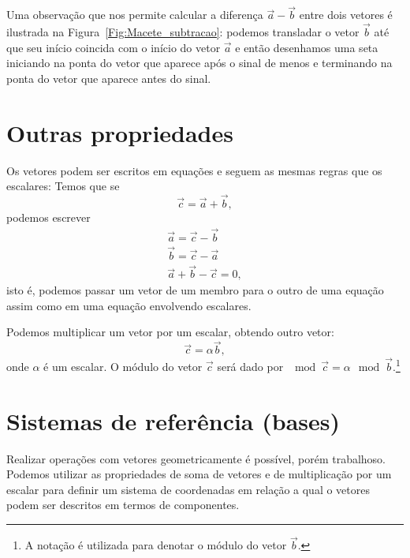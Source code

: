 Uma observação que nos permite calcular a diferença $\vec{a} - \vec{b}$ entre dois vetores é ilustrada na Figura~\ref{Fig:Macete_subtracao}: podemos transladar o vetor $\vec{b}$ até que seu início coincida com o início do vetor $\vec{a}$ e então desenhamos uma seta iniciando na ponta do vetor que aparece após o sinal de menos e terminando na ponta do vetor que aparece antes do sinal.

\section{Outras propriedades}

Os vetores podem ser escritos em equações e seguem as mesmas regras que os escalares: Temos que se
\begin{equation}
  \vec{c} = \vec{a} + \vec{b},
\end{equation}
%
podemos escrever
\begin{align}
  \vec{a} = \vec{c} - \vec{b} \\
  \vec{b} = \vec{c} - \vec{a} \\
  \vec{a} + \vec{b} - \vec{c} = 0,
\end{align}
%
isto é, podemos passar um vetor de um membro para o outro de uma equação assim como em uma equação envolvendo escalares.

Podemos multiplicar um vetor por um escalar, obtendo outro vetor:
\begin{equation}
  \vec{c} = \alpha\vec{b},
\end{equation}
%
onde $\alpha$ é um escalar. O módulo do vetor $\vec{c}$ será dado por $\mod{\vec{c}} = \alpha\mod{\vec{b}}$.\footnote{A notação  é utilizada para denotar o módulo do vetor $\vec{b}$.}

\section{Sistemas de referência (bases)} 

Realizar operações com vetores geometricamente é possível, porém trabalhoso. Podemos utilizar as propriedades de soma de vetores e de multiplicação por um escalar para definir um sistema de coordenadas em relação a qual o vetores podem ser descritos em termos de componentes.

